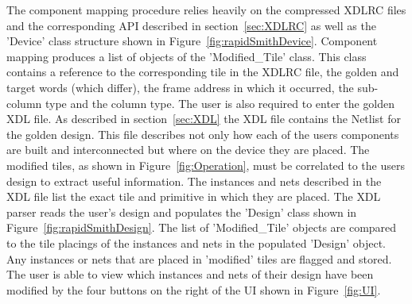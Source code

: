 The component mapping procedure relies heavily on the compressed XDLRC files and the corresponding \acrshort{API} described in section~\ref{sec:XDLRC} as well as the 'Device' class structure shown in Figure~\ref{fig:rapidSmithDevice}.
Component mapping produces a list of objects of the 'Modified\_Tile' class.
This class contains a reference to the corresponding tile in the XDLRC file, the \gls{golden} and \gls{target} words (which differ), the frame address in which it occurred, the sub-column type and the column type.
The user is also required to enter the \gls{golden} \acrshort{XDL} file.
As described in section~\ref{sec:XDL} the \acrshort{XDL} file contains the Netlist for the \gls{golden} design.
This file describes not only how each of the users components are built and interconnected but where on the device they are placed.
The modified tiles, as shown in Figure~\ref{fig:Operation}, must be correlated to the users design to extract useful information.
The instances and nets described in the \acrshort{XDL} file list the exact tile and primitive in which they are placed.
The \RapidSmith \acrshort{XDL} parser reads the user's design and populates the 'Design' class shown in Figure~\ref{fig:rapidSmithDesign}.
The list of 'Modified\_Tile' objects are compared to the tile placings of the instances and nets in the populated 'Design' object.
Any instances or nets that are placed in 'modified' tiles are flagged and stored.
The user is able to view which instances and nets of their design have been modified by the four buttons on the right of the \acrshort{UI} shown in Figure~\ref{fig:UI}.

